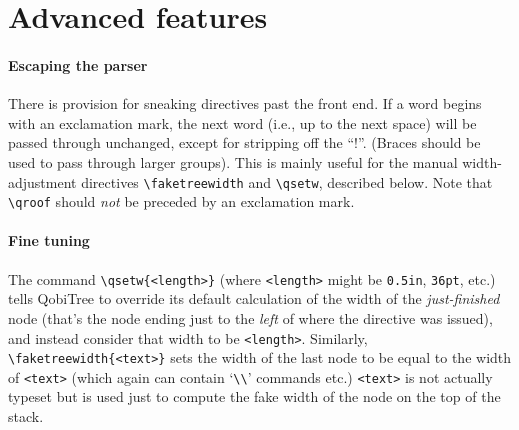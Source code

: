 \documentclass[11pt]{article}
\begin{document}

\section{Advanced features}

\paragraph{Escaping the parser}
There is provision for sneaking directives past the front end.  If a
word begins with an exclamation mark, the next word (i.e., up to the next
space) will be passed through unchanged, except for stripping off the ``!''.
(Braces should be used to pass through larger groups).  This is mainly useful
for the manual width-adjustment directives 
\verb|\faketreewidth| and \verb|\qsetw|, described below. Note that
\verb|\qroof| should {\it not\/}  be preceded by an exclamation mark.

\paragraph{Fine tuning} The command \verb|\qsetw{<length>}| (where
\verb|<length>| might be \verb|0.5in|, \verb|36pt|, etc.) tells QobiTree to
override its default calculation of the width of the {\it just-finished\/}
node (that's the node ending just to the {\it left\/} of where the directive
was issued), and instead consider that width to be \verb|<length>|.  Similarly,
\verb|\faketreewidth{<text>}| sets the width of the last node to be equal to
the width of \verb|<text>| (which again can contain `\verb|\\|' commands etc.)
\verb|<text>| is not actually typeset but is used just to compute the fake
width of the node on the top of the stack.

% 
\end{document}
